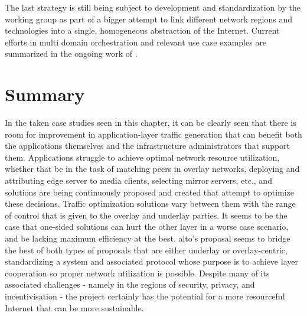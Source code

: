     The last strategy is still being subject to development and standardization by the working group as part of a bigger attempt to link different network regions and technologies into a single, homogeneous abstraction of the Internet.
    Current efforts in multi domain orchestration and relevant use case examples are summarized in the ongoing work of \cite{alto-multi-domain-use-cases}.

\section{Summary}

    In the taken case studies seen in this chapter, it can be clearly seen that there is room for improvement in application-layer traffic generation that can benefit both the applications themselves and the infrastructure administrators that support them.
    Applications struggle to achieve optimal network resource utilization, whether that be in the task of matching peers in overlay networks, deploying and attributing edge server to media clients, selecting mirror servers, etc., and solutions are being continuously proposed and created that attempt to optimize these decisions.
    Traffic optimization solutions vary between them with the range of control that is given to the overlay and underlay parties.
    It seems to be the case that one-sided solutions can hurt the other layer in a worse case scenario, and be lacking maximum efficiency at the best.
    \gls{alto}'s proposal seems to bridge the best of both types of proposals that are either underlay or overlay-centric, standardizing a system and associated protocol whose purpose is to achieve layer cooperation so proper network utilization is possible.
    Despite many of its associated challenges - namely in the regions of security, privacy, and incentivisation - the project certainly has the potential for a more resourceful Internet that can be more sustainable.
